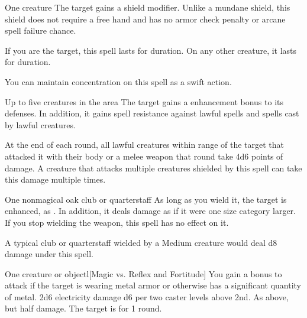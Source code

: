 \spellrng{\rngclose}
\begin{spelltarget}{One creature}
    \spelleffect The target gains a  shield modifier. \spellbonusscalingdescription Unlike a mundane shield, this shield does not require a free hand and has no armor check penalty or arcane spell failure chance.

    \par If you are the target, this spell lasts for \durlong duration. On any other creature, it lasts for \durshort duration.
\end{spelltarget}
\spelleffect You can maintain concentration on this spell as a swift action.

\spelldur{\durshort \dismissable}
\begin{spelltargets}{Up to five creatures in the area}
    The target gains a  enhancement bonus to its defenses. In addition, it gains spell resistance against lawful spells and spells cast by lawful creatures.
    \par At the end of each round, all lawful creatures within \rngclose range of the target that attacked it with their body or a melee weapon that round take 4d6 points of damage. A creature that attacks multiple creatures shielded by this spell can take this damage multiple times.
\end{spelltargets}

\spelldur{\durshort}
\begin{spelltarget}{One nonmagical oak club or quarterstaff}
    \spelleffect As long as you wield it, the target is enhanced, as . In addition, it deals damage as if it were one size category larger. If you stop wielding the weapon, this spell has no effect on it.
\end{spelltarget}
\spellnotes A typical club or quarterstaff wielded by a Medium creature would deal d8 damage under this spell.

\begin{spelltarget}{One creature or object}l[Magic vs. Reflex and Fortitude]
    \spellspecial You gain a  bonus to attack if the target is wearing metal armor or otherwise has a significant quantity of metal.
    \spellsuccess[Reflex] 2d6 electricity damage \add d6 per two caster levels above 2nd.
    \spellfailure[Reflex] As above, but half damage.
     The target is \staggered for 1 round.
\end{spelltarget}

